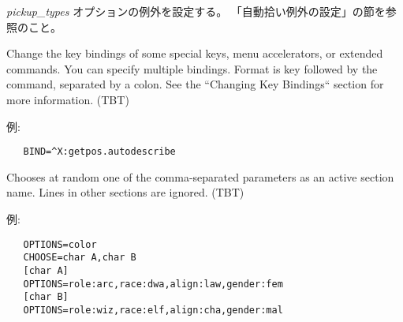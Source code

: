 \item[\bb{AUTOPICKUP\_EXCEPTION}]
{{\it pickup\_types\/}} オプションの例外を設定する。
「自動拾い例外の設定」の節を参照のこと。
\item[\bb{BINDINGS}]
Change the key bindings of some special keys, menu accelerators, or
extended commands. You can specify multiple bindings. Format is key
followed by the command, separated by a colon.
See the ``Changing Key Bindings`` section for more information.
(TBT)

例:
\begin{verbatim}
   BIND=^X:getpos.autodescribe
\end{verbatim}

\item[\bb{CHOOSE}]
Chooses at random one of the comma-separated parameters as an active
section name. Lines in other sections are ignored.
(TBT)

例:
\begin{verbatim}
   OPTIONS=color
   CHOOSE=char A,char B
   [char A]
   OPTIONS=role:arc,race:dwa,align:law,gender:fem
   [char B]
   OPTIONS=role:wiz,race:elf,align:cha,gender:mal
\end{verbatim}

